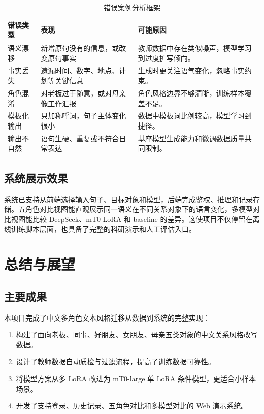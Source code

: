 \documentclass[12pt,a4paper]{ctexart}
\begin{document}
\begin{table}[H]
\centering
\caption{错误案例分析框架}
\label{tab:error_analysis}
\begin{tabular}{p{2.8cm}|p{4cm}|p{5.2cm}}
\toprule
错误类型 & 表现 & 可能原因 \\
\midrule
语义漂移 & 新增原句没有的信息，或改变原句事实 & 教师数据中存在类似噪声，模型学习到过度扩写倾向。 \\
事实丢失 & 遗漏时间、数字、地点、计划等关键信息 & 生成时更关注语气变化，忽略事实约束。 \\
角色混淆 & 对老板过于随意，或对母亲像工作汇报 & 角色风格边界不够清晰，训练样本覆盖不足。 \\
模板化输出 & 只加称呼词，句子主体变化很小 & 数据中模板词比例较高，模型学习到捷径。 \\
输出不自然 & 语句生硬、重复或不符合日常表达 & 基座模型生成能力和微调数据质量共同限制。 \\
\bottomrule
\end{tabular}
\end{table}

\subsection{系统展示效果}

系统已支持从前端选择输入句子、目标对象和模型，后端完成鉴权、推理和记录存储。五角色对比视图能直观展示同一语义在不同关系对象下的语言变化，多模型对比视图能比较 DeepSeek、mT0-LoRA 和 baseline 的差异。这使项目不仅停留在离线训练脚本层面，也具备了完整的科研演示和人工评估入口。

\section{总结与展望}

\subsection{主要成果}

本项目完成了中文多角色文本风格迁移从数据到系统的完整实现：

\begin{enumerate}[leftmargin=2em]
  \item 构建了面向老板、同事、好朋友、女朋友、母亲五类对象的中文关系风格改写数据。
  \item 设计了教师数据自动质检与过滤流程，提高了训练数据可靠性。
  \item 将模型方案从多 LoRA 改进为 mT0-large 单 LoRA 条件模型，更适合小样本场景。
  \item 开发了支持登录、历史记录、五角色对比和多模型对比的 Web 演示系统。
\end{enumerate}
\end{document}
